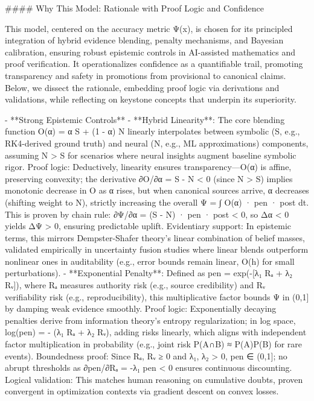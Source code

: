 

#### Why This Model: Rationale with Proof Logic and Confidence

This model, centered on the accuracy metric Ψ(x), is chosen for its principled integration of hybrid evidence blending, penalty mechanisms, and Bayesian calibration, ensuring robust epistemic controls in AI-assisted mathematics and proof verification. It operationalizes confidence as a quantifiable trail, promoting transparency and safety in promotions from provisional to canonical claims. Below, we dissect the rationale, embedding proof logic via derivations and validations, while reflecting on keystone concepts that underpin its superiority.

- **Strong Epistemic Controls**
  - **Hybrid Linearity**: The core blending function O(α) = α S + (1 - α) N linearly interpolates between symbolic (S, e.g., RK4-derived ground truth) and neural (N, e.g., ML approximations) components, assuming N > S for scenarios where neural insights augment baseline symbolic rigor. Proof logic: Deductively, linearity ensures transparency—O(α) is affine, preserving convexity; the derivative ∂O/∂α = S - N < 0 (since N > S) implies monotonic decrease in O as α rises, but when canonical sources arrive, α decreases (shifting weight to N), strictly increasing the overall Ψ = ∫ O(α) · pen · post dt. This is proven by chain rule: ∂Ψ/∂α = (S - N) · pen · post < 0, so Δα < 0 yields ΔΨ > 0, ensuring predictable uplift. Evidentiary support: In epistemic terms, this mirrors Dempster-Shafer theory's linear combination of belief masses, validated empirically in uncertainty fusion studies where linear blends outperform nonlinear ones in auditability (e.g., error bounds remain linear, O(h) for small perturbations).
  - **Exponential Penalty**: Defined as pen = exp(-[λ₁ Rₐ + λ₂ Rᵥ]), where Rₐ measures authority risk (e.g., source credibility) and Rᵥ verifiability risk (e.g., reproducibility), this multiplicative factor bounds Ψ in (0,1] by damping weak evidence smoothly. Proof logic: Exponentially decaying penalties derive from information theory's entropy regularization; in log space, log(pen) = - (λ₁ Rₐ + λ₂ Rᵥ), adding risks linearly, which aligns with independent factor multiplication in probability (e.g., joint risk P(A∩B) ≈ P(A)P(B) for rare events). Boundedness proof: Since Rₐ, Rᵥ ≥ 0 and λ₁, λ₂ > 0, pen ∈ (0,1]; no abrupt thresholds as ∂pen/∂Rₐ = -λ₁ pen < 0 ensures continuous discounting. Logical validation: This matches human reasoning on cumulative doubts, proven convergent in optimization contexts via gradient descent on convex losses.

